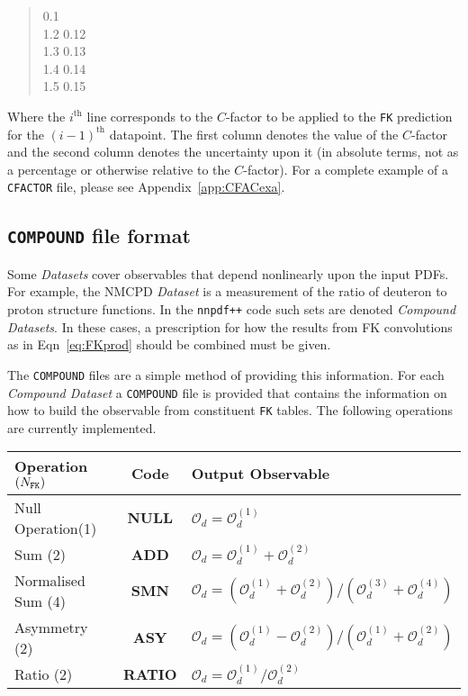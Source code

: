 \documentclass[11pt]{article}
\begin{document}
\begin{quotation}	0.1\\
 1.2	0.12\\
 1.3	0.13\\
 1.4	0.14\\
 1.5	0.15
\end{quotation}
Where the $i^{\text{th}}$ line corresponds to the $C$-factor to be applied to the {\tt FK} prediction for the $(i-1)^{\text{th}}$ datapoint.
The first column denotes the value of the $C$-factor and the second column denotes the uncertainty upon it (in absolute terms, not as a percentage or otherwise relative to the $C$-factor). For a complete example of a {\tt CFACTOR} file, please see Appendix~\ref{app:CFACexa}.

\subsection{{\tt COMPOUND} file format}
Some \emph{Datasets} cover observables that depend nonlinearly upon the input PDFs. For example, the NMCPD \emph{Dataset} is a measurement of the ratio of deuteron to proton structure functions. In the {\tt nnpdf++} code such sets are denoted \emph{Compound Datasets}. In these cases, a prescription for how the results from FK convolutions as in Eqn~\ref{eq:FKprod} should be combined must be given. 

The {\tt COMPOUND} files are a simple method of providing this information. For each \emph{Compound Dataset} a {\tt COMPOUND} file is provided that contains the information on how to build the observable from constituent {\tt FK} tables. The following operations are currently implemented.
\begin{table}[htp]
\begin{center}
\begin{tabular}{|l|c|l|}
\hline
Operation $(N_{\text{\tt FK}})$ & Code & Output Observable\\
\hline\hline
Null Operation(1)& \textbf{NULL} &  $\mathcal{O}_d =  \mathcal{O}_d^{(1)}$ \\
Sum (2)& \textbf{ADD} &  $\mathcal{O}_d = \mathcal{O}^{(1)}_d + \mathcal{O}^{(2)}_d $\\
Normalised Sum (4)&  \textbf{SMN}  & $\mathcal{O}_d = (\mathcal{O}^{(1)}_d + \mathcal{O}^{(2)}_d)/(\mathcal{O}^{(3)}_d + \mathcal{O}^{(4)}_d) $ \\
Asymmetry (2)& \textbf{ASY} &  $\mathcal{O}_d = (\mathcal{O}^{(1)}_d - \mathcal{O}^{(2)}_d)/(\mathcal{O}^{(1)}_d + \mathcal{O}^{(2)}_d) $\\
Ratio (2)&  \textbf{RATIO} & $\mathcal{O}_d = \mathcal{O}^{(1)}_d / \mathcal{O}^{(2)}_d $\\
\hline
\end{tabular}
\end{center}
\label{default}
\end{table}%
\end{document}
